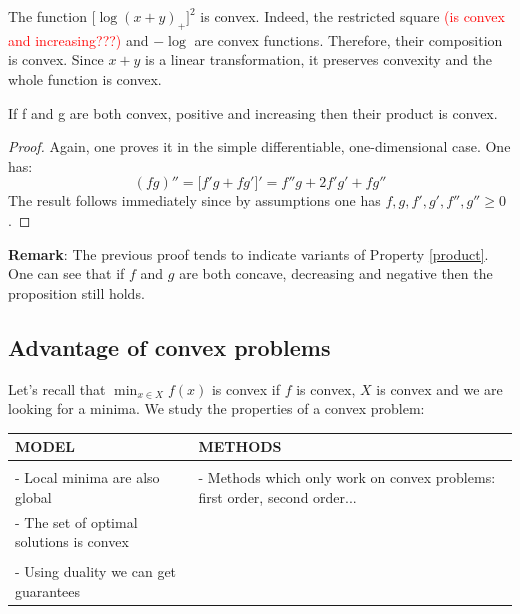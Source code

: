 \begin{example}
\begin{leftbar}
The function $\big[ \log(x+y)_+\big]^2$ is convex. Indeed, the restricted square \textcolor{red}{(is convex and increasing???)} and $-\log$ are convex functions. Therefore, their composition is convex. Since $x+y$ is a linear transformation, it preserves convexity and the whole function is convex. 
\end{leftbar}
\end{example}
\vspace{0.5cm}
\begin{property}\label{product}
If f and g are both convex, positive and increasing then their product is convex.
\end{property}
\begin{proof}
Again, one proves it in the simple differentiable, one-dimensional case. 
One has:
$$(fg)'' = \big[ f'g + fg'\big]' = f''g + 2f'g'+fg''$$
The result follows immediately since by assumptions one has $f,g,f',g',f'',g'' \geq 0$.  
\end{proof}
\textbf{Remark}: The previous proof tends to indicate variants of Property \ref{product}. One can see that if $f$ and $g$ are both concave, decreasing and negative then the proposition still holds.  

\subsection{Advantage of convex problems}
\begin{property}
Let's recall that $ \min_{x \in X} f(x)$ is convex if $f$ is convex, $X$ is convex and we are looking for a minima. We study the properties of a convex problem:
\vspace{0.5cm}
\begin{center}
 \begin{tabular}{p{7cm}|p{7cm}} 
    MODEL & METHODS \\
    \hline
	  & \\
  - Local minima are also global & - Methods which only work on convex problems: first order, second order...  \\
   - The set of optimal solutions is convex & \\
	& \\
    - Using duality we can get guarantees & \\
 \end{tabular}
 \end{center}

 \end{property}
